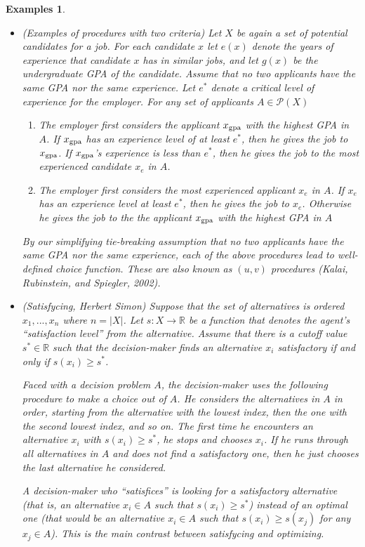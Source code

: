 \documentclass[12pt]{article}
\newtheorem{unex}[ex]{Examples}
\newcommand{\tn}[1]{\textnormal{#1}}
\newcommand{\pp}[1]{\mathcal{P}(#1)}
\newcommand{\RR}{\mathbb{R}}
\newcommand{\3}{\vspace*{3mm}}
\begin{document}
\begin{unex}
\begin{itemize}
\item \tn{(Examples of procedures with two criteria) Let $X$ be again a set of potential candidates for a job. For each candidate $x$ let $e(x)$ denote the years of experience that candidate $x$ has in similar jobs, and let $g(x)$ be the undergraduate GPA of the candidate. Assume that no two applicants have the same GPA nor the same experience. Let $e^*$ denote a critical level of experience for the employer. For any set of applicants $A \in \pp{X}$}
\begin{enumerate}
\item[\tn{(1)}] \tn{The employer first considers the applicant $x_{\tn{gpa}}$ with the highest GPA in $A$. If $x_{\tn{gpa}}$ has an experience level of at least $e^*$, then he gives the job to $x_{\tn{gpa}}$. If
$x_{\tn{gpa}}$’s experience is less than $e^*$, then he gives the job to the most experienced candidate $x_e$ in $A$.}
\item[\tn{(2)}] \tn{The employer first considers the most experienced applicant $x_{e}$ in $A$. If $x_e$ has an experience level at least $e^*$, then he gives the job to $x_e$. Otherwise he gives the job to the the applicant $x_{\tn{gpa}}$ with the highest GPA in $A$}
\end{enumerate}
\tn{By our simplifying tie-breaking assumption that no two applicants have the same GPA nor the same experience, each of the above procedures lead to well-defined choice function. These are also known as $(u, v)$ procedures (Kalai, Rubinstein, and Spiegler, 2002).}

\item \tn{(Satisfycing, Herbert Simon) Suppose that the set of alternatives is ordered $x_1, . . . , x_n$ where $n = |X|$. Let $s : X \to \RR$ be a function that denotes the agent’s “satisfaction
level” from the alternative. Assume that there is a cutoff value $s^* \in \RR$ such that the decision-maker finds an alternative $x_i$ satisfactory if and only if $s(x_i) \geq s^*$. }


\tn{Faced with a decision problem $A$, the decision-maker uses the following procedure to make a choice out of $A$. He considers the alternatives in $A$ in order, starting from the alternative with the lowest index, then the one with the second lowest index, and so on. The first time he encounters an alternative $x_i$ with $s(x_i) \geq s^*$, he stops and chooses $x_i$. If he runs through all alternatives in $A$ and does not find a satisfactory one, then he just chooses the last alternative he considered. }


\tn{A decision-maker who “satisfices” is looking for a satisfactory alternative (that is, an alternative $x_i \in A$ such that $s(x_i) \geq s^*$) instead of an optimal one (that would be an alternative $x_i \in A$ such that $s(x_i) \geq s(x_j)$ for any $x_j \in A$). This is the main contrast between satisfycing and optimizing.}

\end{itemize}
\end{unex}
\end{document}
